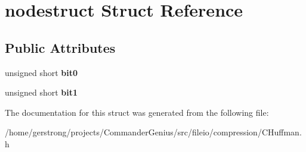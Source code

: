 \hypertarget{structnodestruct}{
\section{nodestruct Struct Reference}
\label{structnodestruct}
}
\subsection*{Public Attributes}
\begin{DoxyCompactItemize}
\item 
\hypertarget{structnodestruct_a8c717da353f3ac2644cf6eede7a31d69}{
unsigned short {\bfseries bit0}}
\label{structnodestruct_a8c717da353f3ac2644cf6eede7a31d69}

\item 
\hypertarget{structnodestruct_ae5c2f51533b18759f43bc4fa9c6f2786}{
unsigned short {\bfseries bit1}}
\label{structnodestruct_ae5c2f51533b18759f43bc4fa9c6f2786}

\end{DoxyCompactItemize}


The documentation for this struct was generated from the following file:\begin{DoxyCompactItemize}
\item 
/home/gerstrong/projects/CommanderGenius/src/fileio/compression/CHuffman.h\end{DoxyCompactItemize}
